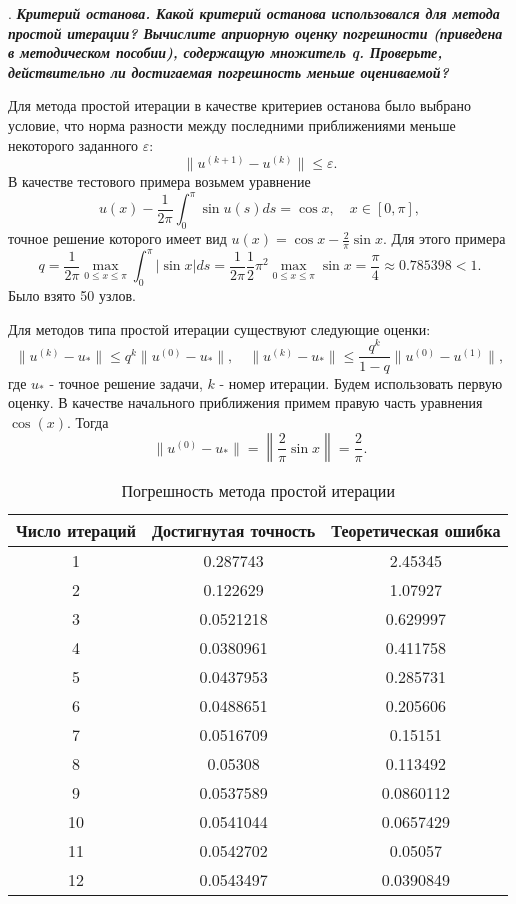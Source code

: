 \documentclass[12pt, a4paper]{article}
\newcounter{mycounter}
\newcommand{\question}[1]{%
	\stepcounter{mycounter}%
	\textbf{\themycounter}.  %
	\textbf{\textit{#1}}
	
}
\begin{document}
	
	\bigskip
	\question{Критерий останова. Какой критерий останова использовался для метода простой итерации? Вычислите априорную оценку погрешности (приведена в методическом пособии), содержащую множитель q. Проверьте, действительно ли достигаемая погрешность меньше оцениваемой?}
		
	Для метода простой итерации в качестве критериев останова было выбрано условие, что норма разности между последними приближениями меньше некоторого заданного $\varepsilon$:
	\[
	\| u^{(k+1)} - u^{(k)} \| \le \varepsilon.
	\]
	В качестве тестового примера возьмем уравнение
	\[
	u(x) - \frac{1}{2\pi} \int_0^\pi \sin u(s) ds = \cos x, \quad x \in [0, \pi],
	\]
	точное решение которого имеет вид $u(x) = \cos x - \frac{2}{\pi} \sin x$. Для этого примера
	\[
	q = \frac{1}{2\pi} \max_{0 \le x \le \pi} \int_0^\pi |\sin x| ds = \frac{1}{2\pi} \frac{1}{2} \pi^2 \max_{0 \le x \le \pi} \sin x = \frac{\pi}{4} \approx 0.785398 < 1.
	\]
	Было взято 50 узлов.
	
	Для методов типа простой итерации существуют следующие оценки:
	\[
	\| u^{(k)} - u_* \| \le q^k \| u^{(0)} - u_* \|, \quad \| u^{(k)} - u_* \| \le \frac{q^k}{1 - q} \| u^{(0)} - u^{(1)} \|,
	\]
	где $u_*$ - точное решение задачи, $k$ - номер итерации. Будем использовать первую оценку. В качестве начального приближения примем правую часть уравнения $\cos(x)$. Тогда
	\[
	\| u^{(0)} - u_* \| = \left\| \frac{2}{\pi} \sin x \right\| = \frac{2}{\pi}.
	\]
	
	\begin{table}[h!]
		\centering
		\caption{Погрешность метода простой итерации}
		\begin{tabular}{|c|c|c|}
			\hline
			Число итераций & Достигнутая точность & Теоретическая ошибка \\
			\hline
			1 & 0.287743 & 2.45345 \\
		2 & 0.122629 & 1.07927 \\
		3 & 0.0521218 & 0.629997 \\
		4 & 0.0380961 & 0.411758 \\
		5 & 0.0437953 & 0.285731 \\
		6 & 0.0488651 & 0.205606 \\
		7 & 0.0516709 & 0.15151 \\
		8 & 0.05308 & 0.113492 \\
		9 & 0.0537589 & 0.0860112 \\
		10 & 0.0541044 & 0.0657429 \\
		11 & 0.0542702 & 0.05057 \\
		12 & 0.0543497 & 0.0390849 \\
			\hline
		\end{tabular}
	\end{table}
		
\end{document}
